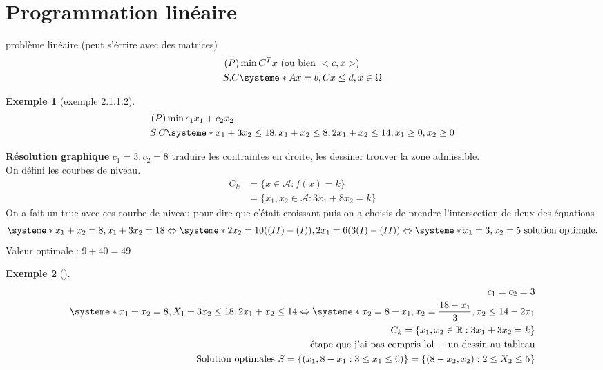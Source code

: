 \documentclass{article}
\theoremstyle{plain}%
\theoremstyle{definition}
\newtheorem{exmp}{Exemple}[section]
\theoremstyle{remark}
\begin{document}
\section{Programmation linéaire}
problème linéaire (peut s'écrire avec des matrices)
\begin{align*}
    (P) &\min C^T x \text{ (ou bien } <c,x>)\\
    S.C &\systeme*{
        Ax=b,
        Cx \leq d,
        x \in \Omega 
    }
\end{align*}

\begin{exmp}[exemple 2.1.1.2]
    \begin{align*}
        (P) & \min c_1 x_1 + c_2 x_2\\
        S.C & \systeme*{
            x_{1} + 3 x_{2} \leq 18,
            x_{1} + x_{2} \leq 8,
            2x_{1} + x_{2} \leq 14,
            x_{1} \geq 0,
            x_{2} \geq 0
        }
    \end{align*}

    \textbf{Résolution graphique}
    $ c_1 = 3, c_2 = 8 $ traduire les contraintes en droite, les dessiner trouver la zone admissible. \\
    On défini les courbes de niveau. 
    \begin{align*}
        C_k &= \{x \in \mathcal{A} : f(x)=k\} \\
            &= \{x_1,x_2 \in \mathcal{A}: 3x_1 + 8x_2 = k\}
    \end{align*}
    On a fait un truc avec ces courbe de niveau pour dire que c'était croissant puis on a choisis de prendre l'intersection de deux des équations 
    \[
        \systeme*{
            x_1 + x_2 = 8,
            x_1 + 3x_2 = 18
        } \Leftrightarrow
        \systeme*{
            2 x_2 = 10 ((II) - (I)),
            2x_1 = 6 (3(I) - (II))
        }\Leftrightarrow
        \systeme*{
            x_1 = 3,
            x_2 = 5
        } \text{ solution optimale}
    .\]
    Valeur optimale : $ 9 + 40 = 49 $ 
\end{exmp}

\begin{exmp}[]
    \begin{align*}
        c_1 = c_2 = 3 \\
        \systeme*{
            x_1 + x_2 = 8,
            X_1 + 3x_2 \leq 18,
            2x_1 + x_2 \leq 14
        } \Leftrightarrow \systeme*{
            x_2 = 8 - x_1,
            x_2 = \frac{18 - x_1}{3},
            x_2 \leq 14 - 2x_1
        } \\
        C_k = \{x_1,x_2 \in \mathbb{R} : 3x_1 + 3 x_2 = k\}\\
        \text{ étape que j'ai pas compris lol + un dessin au tableau} \\
        \text{Solution optimales } S = \{(x_1, 8-x_1 : 3 \leq x_1 \leq 6)\} = \{(8-x_2, x_2) : 2 \leq X_2 \leq 5\}
    \end{align*}
\end{exmp}
\end{document}
